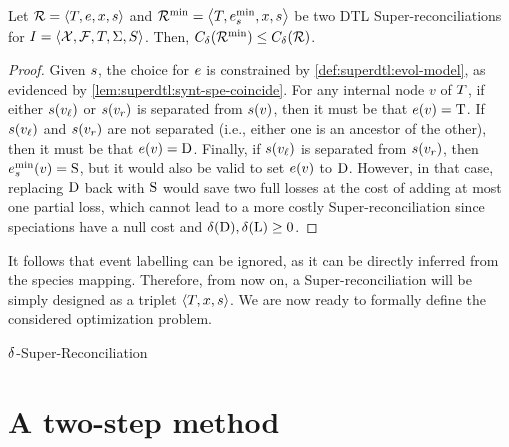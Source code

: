 \begin{lemma}\label{lem:superdtl:event-labeling}
    Let \(\mathcal{R} = \left\langle T, e, x, s\right\rangle\) and \(\mathcal{R}^{\mathrm{min}} = \left\langle T, e^{\mathrm{min}}_s, x, s\right\rangle\) be two DTL Super-reconciliations for \(I = \left\langle\mathcal{X}, \mathcal{F}, T, \Sigma, S\right\rangle\).
    Then, \(C_{\delta\kern.1pt}(\mathcal{R}^{\mathrm{min}}) \leq C_{\delta\kern.1pt}(\mathcal{R})\).
\end{lemma}
\begin{proof}
    Given \(s\), the choice for \(e\) is constrained by \cref{def:superdtl:evol-model}, as evidenced by \cref{lem:superdtl:synt-spe-coincide}.
    For any internal node \(v\) of \(T\), if either \(s(v_\mathit{\ell})\) or \(s(v_r)\) is separated from \(s(v)\), then it must be that \(e(v) = \mathrm{T}\).
    If \(s(v_\mathit{\ell})\) and \(s(v_r)\) are not separated (i.e., either one is an ancestor of the other), then it must be that \(e(v) = \mathrm{D}\).
    Finally, if \(s(v_\mathit{\ell})\) is separated from \(s(v_r)\), then \(e^{\mathrm{min}}_s(v) = \mathrm{S}\), but it would also be valid to set \(e(v)\) to \(\mathrm{D}\).
    However, in that case, replacing \(\mathrm{D}\) back with \(\mathrm{S}\) would save two full losses at the cost of adding at most one partial loss, which cannot lead to a more costly Super-reconciliation since speciations have a null cost and \(\delta\kern.1pt(\mathrm{D}), \delta\kern.1pt(\mathrm{L}) \geq 0\).
\end{proof}

It follows that event labelling can be ignored, as it can be directly inferred from the species mapping. Therefore, from now on, a Super-reconciliation will be simply designed as a triplet \(\left\langle T, x, s\right\rangle\). We are now ready to formally define the considered optimization problem.

\begin{problem}{\(\delta\kern.1pt\)-Super-Reconciliation\label{prob:superdtl:main}}
\end{problem}

\section{A two-step method}\label{sec:superdtl:2steps}

